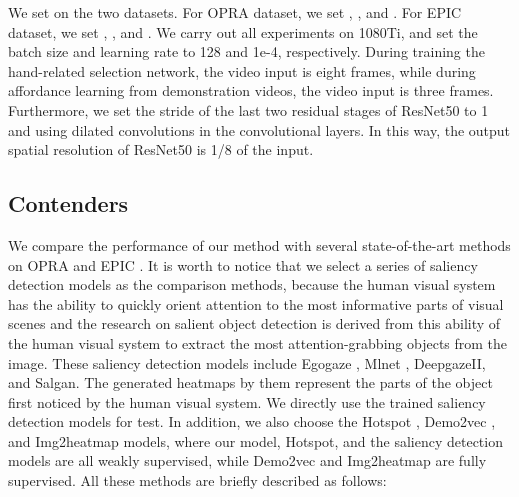 \documentclass[journal,twoside]{IEEEtran}
\begin{document}
\par We set  on the two datasets. For OPRA dataset, we set , , and . For EPIC dataset, we set , , and . We carry out all experiments on 1080Ti, and set the batch size and learning rate to 128 and 1e-4, respectively. During training the hand-related selection network, the video input is eight frames, while during affordance learning from demonstration videos, the video input is three frames. Furthermore, we set the stride of the last two residual stages of ResNet50 to 1 and using dilated convolutions in the convolutional layers. In this way, the output spatial resolution of ResNet50 is 1/8 of the input.

\subsection{Contenders}
We compare the performance of our method with several state-of-the-art methods on OPRA \cite{demo2vec2018cvpr} and EPIC \cite{Damen2018EPICKITCHENS}. It is worth to notice that we select a series of saliency detection models as the comparison methods, because the human visual system has the ability to quickly orient attention to the most informative parts of visual scenes and the research on salient object detection is derived from this ability of the human visual system to extract the most attention-grabbing objects from the image. These saliency detection models include Egogaze \cite{DBLP:conf/eccv/HuangCLS18}, Mlnet \cite{DBLP:conf/icpr/CorniaBSC16}, DeepgazeII\cite{DBLP:journals/corr/KummererWB16}, and Salgan\cite{Pan_2017_SalGAN}. The generated heatmaps by them represent the parts of the object first noticed by the human visual system. We directly use the trained saliency detection models for test. In addition, we also choose the Hotspot \cite{interaction-hotspots}, Demo2vec \cite{demo2vec2018cvpr}, and Img2heatmap \cite{interaction-hotspots} models, where our model, Hotspot, and the saliency detection models are all weakly supervised, while Demo2vec and Img2heatmap are fully supervised. All these methods are briefly described as follows: 
\end{document}
